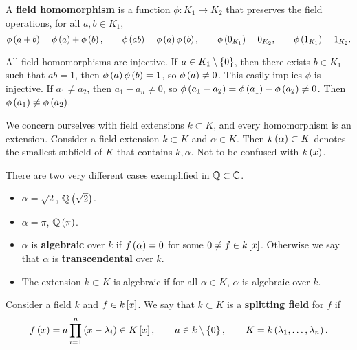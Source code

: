 \begin{definition}
A \textbf{field homomorphism} is a function $ \phi : K_1 \to K_2 $ that preserves the field operations, for all $ a, b \in K_1 $,
$$ \phi\rb{a + b} = \phi\rb{a} + \phi\rb{b}, \qquad \phi\rb{ab} = \phi\rb{a}\phi\rb{b}, \qquad \phi\rb{0_{K_1}} = 0_{K_2}, \qquad \phi\rb{1_{K_1}} = 1_{K_2}. $$
\end{definition}

\begin{remark1}
All field homomorphisms are injective. If $ a \in K_1 \setminus \cb{0} $, then there exists $ b \in K_1 $ such that $ ab = 1 $, then $ \phi\rb{a}\phi\rb{b} = 1 $, so $ \phi\rb{a} \ne 0 $. This easily implies $ \phi $ is injective. If $ a_1 \ne a_2 $, then $ a_1 - a_n \ne 0 $, so $ \phi\rb{a_1 - a_2} = \phi\rb{a_1} - \phi\rb{a_2} \ne 0 $. Then $ \phi\rb{a_1} \ne \phi\rb{a_2} $.
\end{remark1}

We concern ourselves with field extensions $ k \subset K $, and every homomorphism is an extension. Consider a field extension $ k \subset K $ and $ \alpha \in K $. Then $ k\rb{\alpha} \subset K $ denotes the smallest subfield of $ K $ that contains $ k, \alpha $. Not to be confused with $ k\rb{x} $.

\begin{example1}
There are two very different cases exemplified in $ \Q \subset \C $.
\begin{itemize}
\item $ \alpha = \sqrt{2} $, $ \Q\rb{\sqrt{2}} $.
\item $ \alpha = \pi $, $ \Q\rb{\pi} $.
\end{itemize}
\end{example1}

\begin{definition}
\hfill
\begin{itemize}
\item $ \alpha $ is \textbf{algebraic} over $ k $ if $ f\rb{\alpha} = 0 $ for some $ 0 \ne f \in k\sb{x} $. Otherwise we say that $ \alpha $ is \textbf{transcendental} over $ k $.
\item The extension $ k \subset K $ is algebraic if for all $ \alpha \in K $, $ \alpha $ is algebraic over $ k $.
\end{itemize}
\end{definition}

\begin{definition}
Consider a field $ k $ and $ f \in k\sb{x} $. We say that $ k \subset K $ is a \textbf{splitting field} for $ f $ if
$$ f\rb{x} = a\prod_{i = 1}^n \rb{x - \lambda_i} \in K\sb{x}, \qquad a \in k \setminus \cb{0}, \qquad K = k\rb{\lambda_1, \dots, \lambda_n}. $$
\end{definition}

